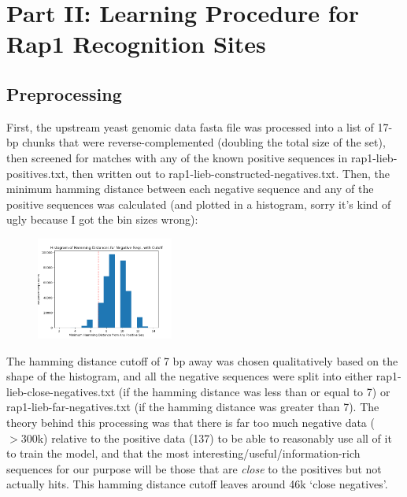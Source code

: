 \documentclass[12pt]{article}
\begin{document}
\section*{Part II: Learning Procedure for Rap1 Recognition Sites}
\subsection*{Preprocessing}
First, the upstream yeast genomic data fasta file was processed into a list of 17-bp chunks that were reverse-complemented (doubling the total size of the set), then screened for matches with any of the known positive sequences in rap1-lieb-positives.txt, then written out to rap1-lieb-constructed-negatives.txt. Then, the minimum hamming distance between each negative sequence and any of the positive sequences was calculated (and plotted in a histogram, sorry it's kind of ugly because I got the bin sizes wrong):
\begin{figure}[h!]
\centering
\includegraphics[width=0.4\textwidth]{HammingDistHistogram.png}
\end{figure}
The hamming distance cutoff of 7 bp away was chosen qualitatively based on the shape of the histogram, and all the negative sequences were split into either rap1-lieb-close-negatives.txt (if the hamming distance was less than or equal to 7) or rap1-lieb-far-negatives.txt (if the hamming distance was greater than 7). The theory behind this processing was that there is far too much negative data ($>300$k) relative to the positive data (137) to be able to reasonably use all of it to train the model, and that the most interesting/useful/information-rich sequences for our purpose will be those that are {\it close} to the positives but not actually hits. This hamming distance cutoff leaves around 46k `close negatives'. 
\end{document}
